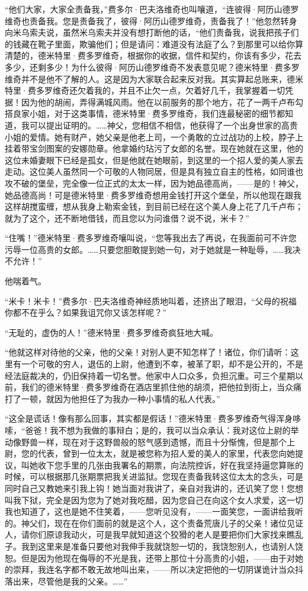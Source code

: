 \par “他们大家，大家全责备我，”费多尔·巴夫洛维奇也叫嚷道，“连彼得·阿历山德罗维奇也责备我。您是责备我了，彼得·阿历山德罗维奇，责备我了！”他忽然转身向米乌索夫说，虽然米乌索夫并没有想打断他的话，“他们责备我，说我把孩子们的钱藏在靴子里面，欺骗他们；但是请问：难道没有法庭了么？到那里可以给你算清楚的，德米特里·费多罗维奇，根据你的收据，信件和契约，你该有多少，花去多少，还剩多少！为什么彼得·阿历山德罗维奇不发表意见呢？德米特里·费多罗维奇并不是他不了解的人。这是因为大家联合起来反对我。其实算起总账来，德米特里·费多罗维奇还欠着我的，并且不止欠一点，欠着好几千，我掌握着一切凭据！因为他的胡闹，弄得满城风雨。他在以前服务的那个地方，花了一两千卢布勾搭良家小姐，对于这类事情，德米特里·费多罗维奇，我们连最秘密的细节都知道，我可以提出证明的。……神父，您相信不相信，他获得了一个出身世家的高贵小姐的爱情。她有财产，她父亲是他老上司，一个勇敢的立过战功的上校，脖子上挂着带宝剑图案的安娜勋章。他拿婚约玷污了女郎的名誉。现在她就在这里，他的这位未婚妻眼下已经是孤女，但是他就在她眼前，到这里的一个招人爱的美人家去走动。这位美人虽然同一个可敬的人物同居，但是具有独立自主的性格，如同谁也攻不破的堡垒，完全像一位正式的太太一样，因为她品德高尚，——是的！神父，她品德高尚！可是德米特里·费多罗维奇想用金钱打开这个堡垒，所以他现在跟我这样胡搅蛮缠，想从我身上勒索金钱，到目前已经在这个美人身上花了几千卢布；就为了这个，还不断地借钱，而且您以为问谁借？说不说，米卡？”
\par “住嘴！”德米特里·费多罗维奇嚷叫说，“您等我出去了再说，在我面前可不许您污辱一位高贵的女郎。……只要您胆敢提到她一句，对于她就是一种耻辱，……我决不允许！”
\par 他喘着气。
\par “米卡！米卡！”费多尔·巴夫洛维奇神经质地叫着，还挤出了眼泪，“父母的祝福你都不在乎么？如果我诅咒你又该怎样呢？”
\par “无耻的，虚伪的人！”德米特里·费多罗维奇疯狂地大喊。
\par “他就这样对待他的父亲，他的父亲！对别人更不知怎样了！诸位，你们请听：这里有一个可敬的穷人，退伍的上尉，他遭到不幸，被革了职，却不是公开的，不是经法庭裁决的，仍旧保持着一切名誉。他家中人口众多，负担沉重。可三个星期以前，我们的德米特里·费多罗维奇在酒店里抓住他的胡须，把他拉到街上，当众痛打了一顿，就因为他担任了为我办一种小事情的私人代表。”
\par “这全是谎话！像有那么回事，其实都是假话！”德米特里·费多罗维奇气得浑身哆嗦，“爸爸！我不想为我做的事辩白；是的，我可以当众承认：我对这位上尉的举动像野兽一样，现在对于这野兽般的怒气感到遗憾，而且十分惭愧，但是那个上尉，您的代表，曾到一位太太，就是被您称为招人爱的美人的家里，代表您向她提议，叫她收下您手里的几张由我署名的期票，向法院控诉，好在我坚持逼您算账的时候，可以根据那几张期票把我关进监狱。您现在责备我转这位太太的念头，可是同时自己又教她来引我上钩！她当面对我讲了，亲自对我讲的，还讥笑了您！您想叫我下狱，完全是因为您为了她对我吃醋，因为您自己在向这个女人求爱，这一切我也知道了，这也是她不住笑着，——您听见没有，——一面笑您，一面讲给我听的。神父们，现在在你们面前的就是这个人，这个责备荒唐儿子的父亲！诸位见证人，请你们原谅我动火，可是我早就知道这个狡猾的老人是要把你们大家找来瞧乱子。我到这里来是准备只要他对我伸手我就饶恕一切的，我饶恕别人，也请别人饶恕。但是因为他现在侮辱的不光是我，还带上那位十分高贵的小姐，——由于对她的崇拜，我连名字都不敢无故地叫出来，——所以决定把他的一切阴谋诡计当众抖落出来，尽管他是我的父亲。……”
